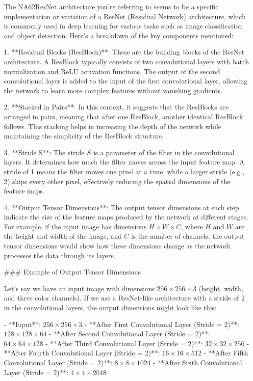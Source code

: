 The NA62ResNet architecture you're referring to seems to be a specific implementation or variation of a ResNet (Residual Network) architecture, which is commonly used in deep learning for various tasks such as image classification and object detection. Here's a breakdown of the key components mentioned:

1. **Residual Blocks (ResBlock)**: These are the building blocks of the ResNet architecture. A ResBlock typically consists of two convolutional layers with batch normalization and ReLU activation functions. The output of the second convolutional layer is added to the input of the first convolutional layer, allowing the network to learn more complex features without vanishing gradients.

2. **Stacked in Pairs**: In this context, it suggests that the ResBlocks are arranged in pairs, meaning that after one ResBlock, another identical ResBlock follows. This stacking helps in increasing the depth of the network while maintaining the simplicity of the ResBlock structure.

3. **Stride S**: The stride \( S \) is a parameter of the filter in the convolutional layers. It determines how much the filter moves across the input feature map. A stride of 1 means the filter moves one pixel at a time, while a larger stride (e.g., 2) skips every other pixel, effectively reducing the spatial dimensions of the feature maps.

4. **Output Tensor Dimensions**: The output tensor dimensions at each step indicate the size of the feature maps produced by the network at different stages. For example, if the input image has dimensions \( H \times W \times C \), where \( H \) and \( W \) are the height and width of the image, and \( C \) is the number of channels, the output tensor dimensions would show how these dimensions change as the network processes the data through its layers.

### Example of Output Tensor Dimensions

Let's say we have an input image with dimensions \( 256 \times 256 \times 3 \) (height, width, and three color channels). If we use a ResNet-like architecture with a stride of 2 in the convolutional layers, the output dimensions might look like this:

- **Input**: \( 256 \times 256 \times 3 \)
- **After First Convolutional Layer (Stride = 2)**: \( 128 \times 128 \times 64 \)
- **After Second Convolutional Layer (Stride = 2)**: \( 64 \times 64 \times 128 \)
- **After Third Convolutional Layer (Stride = 2)**: \( 32 \times 32 \times 256 \)
- **After Fourth Convolutional Layer (Stride = 2)**: \( 16 \times 16 \times 512 \)
- **After Fifth Convolutional Layer (Stride = 2)**: \( 8 \times 8 \times 1024 \)
- **After Sixth Convolutional Layer (Stride = 2)**: \( 4 \times 4 \times 2048 \)

